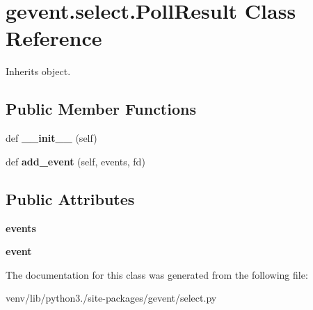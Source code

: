 \hypertarget{classgevent_1_1select_1_1_poll_result}{}\section{gevent.\+select.\+Poll\+Result Class Reference}
\label{classgevent_1_1select_1_1_poll_result}


Inherits object.

\subsection*{Public Member Functions}
\begin{DoxyCompactItemize}
\item 
\mbox{\label{classgevent_1_1select_1_1_poll_result_a872be334c935476dfc15b2719635a1f5}} 
def {\bfseries \+\_\+\+\_\+init\+\_\+\+\_\+} (self)
\item 
\mbox{\label{classgevent_1_1select_1_1_poll_result_a3117957f6e23a4fab6f908ab1b1d7635}} 
def {\bfseries add\+\_\+event} (self, events, fd)
\end{DoxyCompactItemize}
\subsection*{Public Attributes}
\begin{DoxyCompactItemize}
\item 
\mbox{\label{classgevent_1_1select_1_1_poll_result_a22b5065622d95f9c830b5a3bb48a7700}} 
{\bfseries events}
\item 
\mbox{\label{classgevent_1_1select_1_1_poll_result_a96441d969b643490d0bb04fd3f19065d}} 
{\bfseries event}
\end{DoxyCompactItemize}


The documentation for this class was generated from the following file\+:\begin{DoxyCompactItemize}
\item 
venv/lib/python3./site-\/packages/gevent/select.\+py\end{DoxyCompactItemize}
